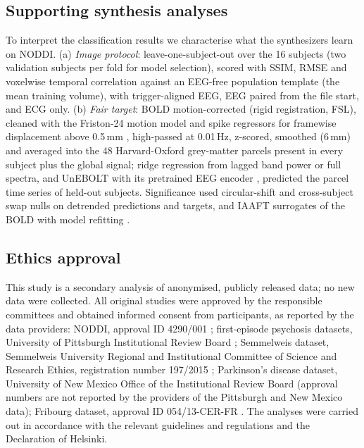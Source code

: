 \documentclass[pdflatex,referee,sn-basic]{sn-jnl}%
\begin{document}
\subsection{Supporting synthesis analyses}\label{setting:fidelity}

To interpret the classification results we characterise what the synthesizers learn on NODDI. (a) \emph{Image protocol}: leave-one-subject-out over the 16 subjects (two validation subjects per fold for model selection), scored with SSIM, RMSE and voxelwise temporal correlation against an EEG-free population template (the mean training volume), with trigger-aligned EEG, EEG paired from the file start, and ECG only. (b) \emph{Fair target}: BOLD motion-corrected (rigid registration, FSL), cleaned with the Friston-24 motion model and spike regressors for framewise displacement above 0.5\,mm \cite{friston1996,power2014}, high-passed at 0.01\,Hz, z-scored, smoothed (6\,mm) and averaged into the 48 Harvard-Oxford grey-matter parcels present in every subject plus the global signal; ridge regression from lagged band power or full spectra, and UnEBOLT \cite{li2026unebolt} with its pretrained EEG encoder \cite{jiang2024labram}, predicted the parcel time series of held-out subjects. Significance used circular-shift and cross-subject swap nulls on detrended predictions and targets, and IAAFT surrogates of the BOLD with model refitting \cite{schreiber1996,mehta2025time}.

\subsection{Ethics approval}\label{section:ethics}

This study is a secondary analysis of anonymised, publicly released data; no new data were collected. All original studies were approved by the responsible committees and obtained informed consent from participants, as reported by the data providers: NODDI, approval ID 4290/001 \cite{dataset_01}; first-episode psychosis datasets, University of Pittsburgh Institutional Review Board \cite{salisbury_ds003944,salisbury_ds003947}; Semmelweis dataset, Semmelweis University Regional and Institutional Committee of Science and Research Ethics, registration number 197/2015 \cite{racz2025}; Parkinson's disease dataset, University of New Mexico Office of the Institutional Review Board \cite{cavanagh_ds003490} (approval numbers are not reported by the providers of the Pittsburgh and New Mexico data); Fribourg dataset, approval ID 054/13-CER-FR \cite{dataset2022fribourg}. The analyses were carried out in accordance with the relevant guidelines and regulations and the Declaration of Helsinki.
\end{document}
